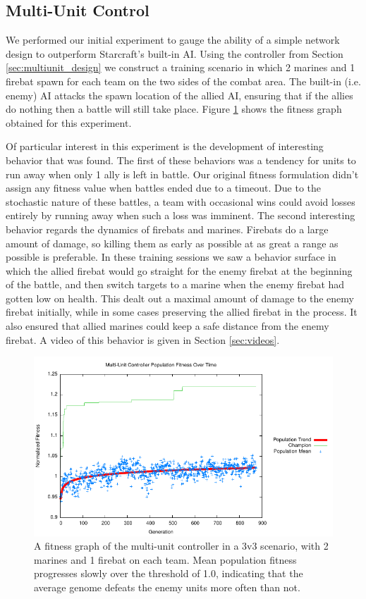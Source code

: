 \documentclass[a4paper]{article}
\begin{document}
\subsection{Multi-Unit Control}

We performed our initial experiment to gauge the ability of a simple network design to outperform Starcraft's built-in AI. Using the controller from Section \ref{sec:multiunit_design} we construct a training scenario in which 2 marines and 1 firebat spawn for each team on the two sides of the combat area. The built-in (i.e. enemy) AI attacks the spawn location of the allied AI, ensuring that if the allies do nothing then a battle will still take place. Figure \ref{fig:multiunit_exp} shows the fitness graph obtained for this experiment.

Of particular interest in this experiment is the development of interesting behavior that was found. The first of these behaviors was a tendency for units to run away when only 1 ally is left in battle. Our original fitness formulation didn't assign any fitness value when battles ended due to a timeout. Due to the stochastic nature of these battles, a team with occasional wins could avoid losses entirely by running away when such a loss was imminent. The second interesting behavior regards the dynamics of firebats and marines. Firebats do a large amount of damage, so killing them as early as possible at as great a range as possible is preferable. In these training sessions we saw a behavior surface in which the allied firebat would go straight for the enemy firebat at the beginning of the battle, and then switch targets to a marine when the enemy firebat had gotten low on health. This dealt out a maximal amount of damage to the enemy firebat initially, while in some cases preserving the allied firebat in the process. It also ensured that allied marines could keep a safe distance from the enemy firebat. A video of this behavior is given in Section \ref{sec:videos}.

\begin{figure}
\centering
\includegraphics[scale=1.1]{plots/multiunit.pdf}
\caption{A fitness graph of the multi-unit controller in a 3v3 scenario, with 2 marines and 1 firebat on each team. Mean population fitness progresses slowly over the threshold of 1.0, indicating that the average genome defeats the enemy units more often than not.}
\label{fig:multiunit_exp}
\end{figure}
\end{document}
